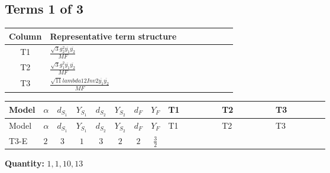 \documentclass[8pt]{article}
\begin{document}
\begin{landscape}
\subsection*{Terms 1 of 3}
\begin{center}
\begin{tabular}{@{}c >{\raggedright\arraybackslash}p{0.82\linewidth}@{}}
\toprule
Column & Representative term structure \\
\midrule
T1 & \(\displaystyle \frac{\sqrt{3} g_{2}^{2} \overline{y_{1}} \overline{y_{2}}}{MF}\) \\
\midrule
T2 & \(\displaystyle \frac{\sqrt{3} g_{1}^{2} \overline{y_{1}} \overline{y_{2}}}{MF}\) \\
\midrule
T3 & \(\displaystyle \frac{\sqrt{11} lambda12Inv2 \overline{y_{1}} \overline{y_{2}}}{MF}\) \\
\midrule
\bottomrule
\end{tabular}
\end{center}
\smallskip
\tiny
\begin{longtable}{@{}llcccccc >{\raggedright\arraybackslash}p{0.21\linewidth} >{\raggedright\arraybackslash}p{0.21\linewidth} >{\raggedright\arraybackslash}p{0.21\linewidth}@{}}
\toprule
Model & $\alpha$ & $d_{S_1}$ & $Y_{S_1}$ & $d_{S_2}$ & $Y_{S_2}$ & $d_F$ & $Y_F$ & T1 & T2 & T3 \\
\midrule
\endfirsthead
\toprule
Model & $\alpha$ & $d_{S_1}$ & $Y_{S_1}$ & $d_{S_2}$ & $Y_{S_2}$ & $d_F$ & $Y_F$ & T1 & T2 & T3 \\
\midrule
\endhead
T3-E & $2$ & $3$ & $1$ & $3$ & $2$ & $2$ & $\frac{3}{2}$ & \scriptsize\adjustbox{max width=\linewidth}{$\begin{gathered} - \frac{49 \sqrt{3} g_{2}^{2} \overline{y_{1}} \overline{y_{2}}}{24 MF}\end{gathered}$} & \scriptsize\adjustbox{max width=\linewidth}{$\begin{gathered} - \frac{9 \sqrt{3} g_{1}^{2} \overline{y_{1}} \overline{y_{2}}}{8 MF}\end{gathered}$} & \scriptsize\adjustbox{max width=\linewidth}{$\begin{gathered} - \frac{3 \sqrt{11} lambda12Inv2 \overline{y_{1}} \overline{y_{2}}}{22 MF}\end{gathered}$} \\
\midrule
\bottomrule
\end{longtable}
\clearpage
\noindent\textbf{Quantity: }$\mathrm{1,1,10,13}$\par\smallskip

\end{landscape}
\end{document}
